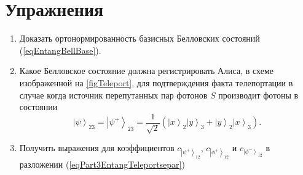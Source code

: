 %













\section{Упражнения}
\begin{enumerate}
\item Доказать ортонормированность базисных Белловских состояний
  (\ref{eqEntangBellBase}). 
\item Какое Белловское состояние должна регистрировать Алиса, в схеме
  изображенной на \autoref{figTeleport}, для
  подтверждения факта телепортации в случае когда источник
  перепутанных пар фотонов $S$ производит фотоны в состоянии 
\begin{equation}
  \left|\psi\right>_{23} = \left|\psi^{+}\right>_{23} = \frac{1}{\sqrt{2}}\left(
  \left|x\right>_2\left|y\right>_3 +
  \left|y\right>_2\left|x\right>_3
  \right).
  \nonumber
\end{equation}
\item Получить выражения для коэффициентов 
$c_{\left|\psi^{+}\right>_{12}}$, 
$c_{\left|\phi^{+}\right>_{12}}$ и 
$c_{\left|\phi^{-}\right>_{12}}$
в разложении (\ref{eqPart3EntangTeleportsepar})
\end{enumerate}
